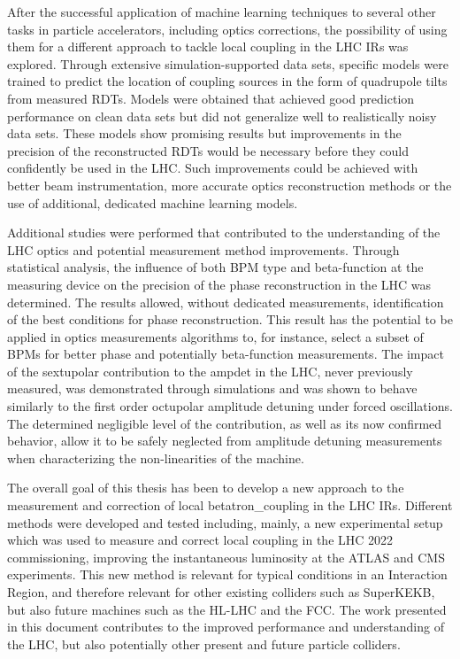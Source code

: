 After the successful application of machine learning techniques to several other tasks in particle accelerators, including optics corrections, the possibility of using them for a different approach to tackle local coupling in the \gls{LHC} \glspl{IR} was explored.
Through extensive simulation-supported data sets, specific models were trained to predict the location of coupling sources in the form of quadrupole tilts from measured \glspl{RDT}.
Models were obtained that achieved good prediction performance on clean data sets but did not generalize well to realistically noisy data sets.
These models show promising results but improvements in the precision of the reconstructed \glspl{RDT} would be necessary before they could confidently be used in the \gls{LHC}.
Such improvements could be achieved with better beam instrumentation, more accurate optics reconstruction methods or the use of additional, dedicated machine learning models.
\break

Additional studies were performed that contributed to the understanding of the \gls{LHC} \gls{optics} and potential measurement method improvements.
Through statistical analysis, the influence of both \gls{BPM} type and \gls{beta-function} at the measuring device on the precision of the phase reconstruction in the \gls{LHC} was determined.
The results allowed, without dedicated measurements, identification of the best conditions for phase reconstruction.
This result has the potential to be applied in optics measurements algorithms to, for instance, select a subset of \glspl{BPM} for better phase and potentially \gls{beta-function} measurements.
The impact of the sextupolar contribution to the \gls{ampdet} in the \gls{LHC}, never previously measured, was demonstrated through simulations and was shown to behave similarly to the first order octupolar amplitude detuning under forced oscillations.
The determined negligible level of the contribution, as well as its now confirmed behavior, allow it to be safely neglected from amplitude detuning measurements when characterizing the non-linearities of the machine.
\break

The overall goal of this thesis has been to develop a new approach to the measurement and correction of local \gls{betatron_coupling} in the \gls{LHC} \glspl{IR}.
Different methods were developed and tested including, mainly, a new experimental setup which was used to measure and correct local coupling in the \gls{LHC} \num{2022} commissioning, improving the instantaneous luminosity at the \acrshort{ATLAS} and \acrshort{CMS} \glspl{experiment}.
This new method is relevant for typical conditions in an Interaction Region, and therefore relevant for other existing colliders such as SuperKEKB, but also future machines such as the \gls{HL-LHC} and the \gls{FCC}.
The work presented in this document contributes to the improved performance and understanding of the \gls{LHC}, but also potentially other present and future particle colliders.

\glsresetall                                     %
